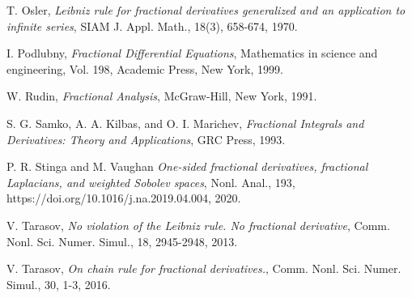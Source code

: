 \documentclass[leqno,final]{siamltex}
\numberwithin{equation}{section}
\renewcommand{\(}{\bigl(}
\renewcommand{\)}{\bigr)}
\begin{document}
\begin{thebibliography}{99}
{\sc T. Osler},
{\em Leibniz rule for fractional derivatives generalized and an application to infinite series},
SIAM J. Appl. Math., 18(3), 658-674, 1970.
    
   
{\sc I. Podlubny},
{\em Fractional Differential Equations}, 
Mathematics in science and engineering, Vol. 198, Academic Press,  New York, 1999.
    
    
{\sc W. Rudin},
{\em Fractional Analysis},  McGraw-Hill, New York, 1991.   
    
    
{\sc S. G. Samko, A. A. Kilbas, and O. I. Marichev},
{\em Fractional Integrals and Derivatives: Theory and Applications},
GRC Press,  1993.

{\sc P. R. Stinga and M. Vaughan}
{\em One-sided fractional derivatives, fractional Laplacians, and weighted Sobolev spaces},
Nonl. Anal., 193, https://doi.org/10.1016/j.na.2019.04.004, 2020.
 
    
{\sc V. Tarasov},
{\em No violation of the Leibniz rule. No fractional derivative},
Comm. Nonl. Sci. Numer. Simul., 18, 2945-2948, 2013.

{\sc V. Tarasov},
{\em On chain rule for fractional derivatives.},
Comm. Nonl. Sci. Numer. Simul., 30, 1-3, 2016.

\end{thebibliography}

    
\end{document}
